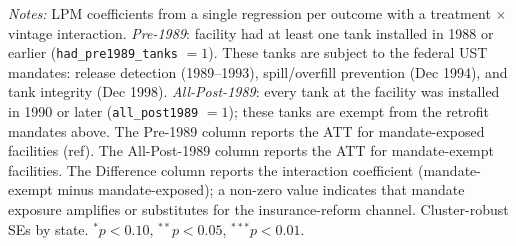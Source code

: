 \begin{table}[htbp]
\begin{minipage}{\linewidth}
\textit{Notes:} LPM coefficients from a single regression per outcome with a treatment $\times$ vintage interaction. \textit{Pre-1989}: facility had at least one tank installed in 1988 or earlier (\texttt{had\_pre1989\_tanks} $= 1$). These tanks are subject to the federal UST mandates: release detection (1989--1993), spill/overfill prevention (Dec 1994), and tank integrity (Dec 1998). \textit{All-Post-1989}: every tank at the facility was installed in 1990 or later (\texttt{all\_post1989} $= 1$); these tanks are exempt from the retrofit mandates above. The Pre-1989 column reports the ATT for mandate-exposed facilities (ref). The All-Post-1989 column reports the ATT for mandate-exempt facilities. The Difference column reports the interaction coefficient (mandate-exempt minus mandate-exposed); a non-zero value indicates that mandate exposure amplifies or substitutes for the insurance-reform channel. Cluster-robust SEs by state. $^{*}p<0.10$, $^{**}p<0.05$, $^{***}p<0.01$.
\end{minipage}
\end{table}
